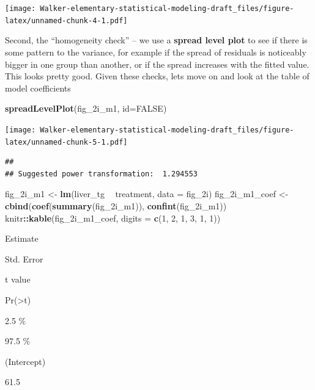 \documentclass[]{book}
\newenvironment{Shaded}{\begin{snugshade}}{\end{snugshade}}
\newcommand{\DataTypeTok}[1]{\textcolor[rgb]{0.13,0.29,0.53}{#1}}
\newcommand{\DecValTok}[1]{\textcolor[rgb]{0.00,0.00,0.81}{#1}}
\newcommand{\KeywordTok}[1]{\textcolor[rgb]{0.13,0.29,0.53}{\textbf{#1}}}
\newcommand{\NormalTok}[1]{#1}
\newcommand{\OperatorTok}[1]{\textcolor[rgb]{0.81,0.36,0.00}{\textbf{#1}}}
\newcommand{\OtherTok}[1]{\textcolor[rgb]{0.56,0.35,0.01}{#1}}
\newcommand{\StringTok}[1]{\textcolor[rgb]{0.31,0.60,0.02}{#1}}
\begin{document}
\texttt{[image: Walker-elementary-statistical-modeling-draft\_files/figure-latex/unnamed-chunk-4-1.pdf]}

Second, the ``homogeneity check'' -- we use a \textbf{spread level plot} to see if there is some pattern to the variance, for example if the spread of residuals is noticeably bigger in one group than another, or if the spread increases with the fitted value.
This looks pretty good. Given these checks, lets move on and look at the table of model coefficients

\begin{Shaded}
\begin{Highlighting}[]
\KeywordTok{spreadLevelPlot}\NormalTok{(fig_2i_m1, }\DataTypeTok{id=}\OtherTok{FALSE}\NormalTok{)}
\end{Highlighting}
\end{Shaded}

\texttt{[image: Walker-elementary-statistical-modeling-draft\_files/figure-latex/unnamed-chunk-5-1.pdf]}

\begin{verbatim}
## 
## Suggested power transformation:  1.294553
\end{verbatim}

\begin{Shaded}
\begin{Highlighting}[]
\NormalTok{fig_2i_m1 <-}\StringTok{ }\KeywordTok{lm}\NormalTok{(liver_tg }\OperatorTok{~}\StringTok{ }\NormalTok{treatment, }\DataTypeTok{data =}\NormalTok{ fig_2i)}
\NormalTok{fig_2i_m1_coef <-}\StringTok{ }\KeywordTok{cbind}\NormalTok{(}\KeywordTok{coef}\NormalTok{(}\KeywordTok{summary}\NormalTok{(fig_2i_m1)),}
                        \KeywordTok{confint}\NormalTok{(fig_2i_m1))}
\NormalTok{knitr}\OperatorTok{::}\KeywordTok{kable}\NormalTok{(fig_2i_m1_coef, }\DataTypeTok{digits =} \KeywordTok{c}\NormalTok{(}\DecValTok{1}\NormalTok{, }\DecValTok{2}\NormalTok{, }\DecValTok{1}\NormalTok{, }\DecValTok{3}\NormalTok{, }\DecValTok{1}\NormalTok{, }\DecValTok{1}\NormalTok{))}
\end{Highlighting}
\end{Shaded}

Estimate

Std. Error

t value

Pr(\textgreater\textbar t\textbar)

2.5 \%

97.5 \%

(Intercept)

61.5
\end{document}
